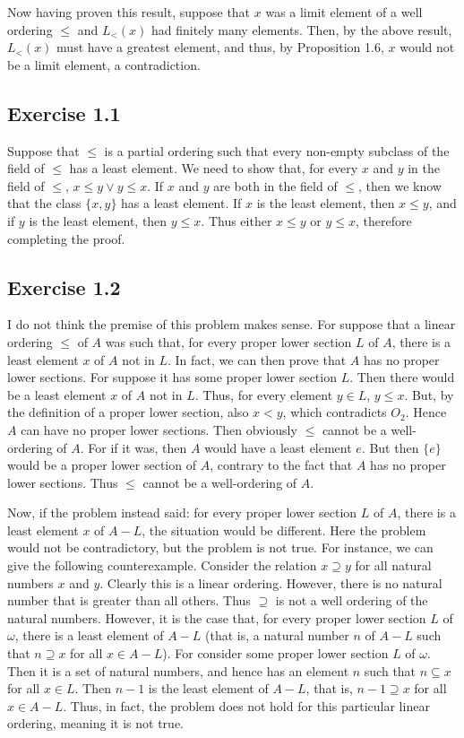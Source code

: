 \documentclass{article}
\theoremstyle{definition}
\begin{document}
Now having proven this result, suppose that $x$ was a limit element of a well ordering $\le$ and $L_<(x)$ had finitely many elements. Then, by the above result, 
$L_<(x)$ must have a greatest element, and thus, by Proposition 1.6, $x$ would not be a limit element, a contradiction.

\subsection*{Exercise 1.1}
Suppose that $\le$ is a partial ordering such that every non-empty subclass of the field of $\le$ has a least element. We need to show that, for every 
$x$ and $y$ in the field of $\le$, $x\le y\vee y\le x$. If $x$ and $y$ are both in the field of $\le$, then we know that the class 
$\{x,y\}$ has a least element. If $x$ is the least element, then $x\le y$, and if $y$ is the least element, then $y\le x$. Thus 
either $x\le y$ or $y\le x$, therefore completing the proof.

\subsection*{Exercise 1.2}
I do not think the premise of this problem makes sense. For suppose that a linear ordering $\le$ of $A$ was such that, for every proper lower section $L$ of 
$A$, there is a least element $x$ of $A$ not in $L$. In fact, we can then prove that $A$ has no proper lower sections. For suppose it has some proper lower 
section $L$. 
Then there would be a least element $x$ of $A$ not in $L$. Thus, for every element $y\in L$, $y\le x$. But, by the definition of a proper lower section, 
also $x<y$, which contradicts $O_2$. Hence $A$ can have no proper lower sections. Then obviously $\le$ cannot be a well-ordering of $A$. For if it was, then 
$A$ would have a least element $e$. But then $\{e\}$ would be a proper lower section of $A$, contrary to the fact that $A$ has no proper lower sections. Thus 
$\le$ cannot be a well-ordering of $A$.

Now, if the problem instead said: for every proper lower section $L$ of $A$, there is a least element $x$ of $A-L$, the situation would be different. Here the problem 
would not be contradictory, but the problem is not true. For instance, we can give the following counterexample. Consider the relation $x\supseteq y$ for all natural numbers $x$ and $y$. 
Clearly this is a linear ordering. However, there is no natural number that is greater than all others. Thus $\supseteq$ is not a 
well ordering of the natural numbers. However, it is the case that, for every proper lower section $L$ of $\omega$, there is a least element of $A-L$ (that is, a natural number $n$ of $A-L$ such 
that $n\supseteq x$ for all $x\in A-L$). For consider some proper lower section 
$L$ of $\omega$. Then it is a set of natural numbers, and hence has an element $n$ such that $n\subseteq x$ for all $x\in L$. Then $n-1$ is the least element of $A-L$, that is, 
$n-1\supseteq x$ for all $x\in A-L$. Thus, in fact, 
the problem does not hold for this particular linear ordering, meaning it is not true.
\end{document}
